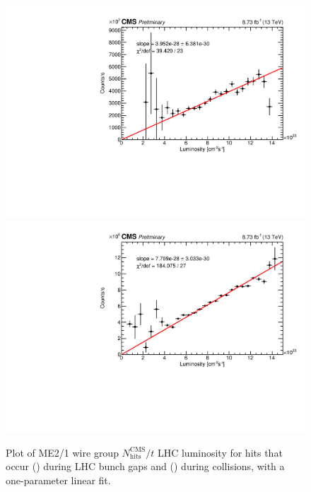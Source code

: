 \begin{figure}
	\centering
	\includegraphics[width=\dummyFigWidth]{figures/neutron/luminosity_21_wire_early_CHAM_TIME_20180416_fit.pdf}
	\includegraphics[width=\dummyFigWidth]{figures/neutron/luminosity_21_wire_total_CHAM_TIME_20180416_fit.pdf}
	\caption{Plot of ME2/1 wire group ${N}^\text{CMS}_\text{hits}/{t}$ \vs LHC luminosity for hits that occur () during LHC bunch gaps and () during \pp collisions, with a one-parameter linear fit.}
	\label{fig:ME21_HvsL}
\end{figure}

